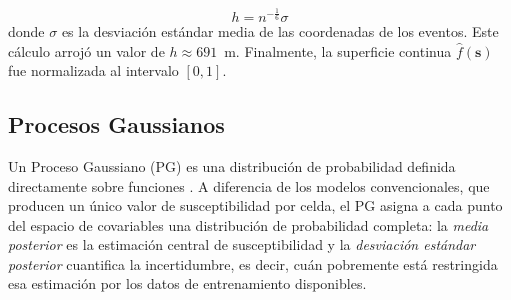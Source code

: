 \documentclass[letterpaper,11pt]{tec}
\begin{document}
{\begin{equation}
    h = n^{-\frac{1}{6}} \sigma
    \label{eq:silverman}
\end{equation}
donde $\sigma$ es la desviación estándar media de las coordenadas de los eventos. Este cálculo arrojó un valor de $h \approx 691$~m. 
Finalmente, la superficie continua $\hat{f}(\mathbf{s})$ fue normalizada al intervalo $[0,1]$.

\subsection{Procesos Gaussianos}
Un Proceso Gaussiano (PG) es una distribución de probabilidad definida directamente sobre funciones
\citep{Rasmussen2006}. A diferencia de los modelos convencionales, que producen un único valor de
susceptibilidad por celda, el PG asigna a cada punto del espacio de covariables una distribución
de probabilidad completa: la \textit{media posterior} es la estimación central de susceptibilidad y la
\textit{desviación estándar posterior} cuantifica la incertidumbre, es decir,
cuán pobremente está restringida esa estimación por los datos de entrenamiento disponibles.

}
\end{document}
